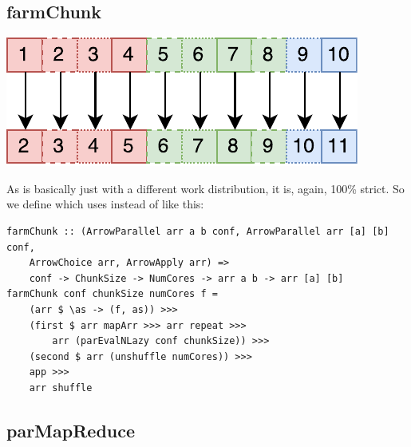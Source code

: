 \subsection{farmChunk}
\begin{center}
	\includegraphics[scale=0.7]{images/farmChunk}
\end{center}
As  is basically just  with a different work distribution, it is, again, 100\% strict. So we define  which uses  instead of  like this:
\begin{lstlisting}[frame=htrbl]
farmChunk :: (ArrowParallel arr a b conf, ArrowParallel arr [a] [b] conf,
	ArrowChoice arr, ArrowApply arr) =>
	conf -> ChunkSize -> NumCores -> arr a b -> arr [a] [b]
farmChunk conf chunkSize numCores f =
	(arr $ \as -> (f, as)) >>>
	(first $ arr mapArr >>> arr repeat >>>
		arr (parEvalNLazy conf chunkSize)) >>>
	(second $ arr (unshuffle numCores)) >>>
	app >>>
	arr shuffle
\end{lstlisting}

\subsection{parMapReduce}